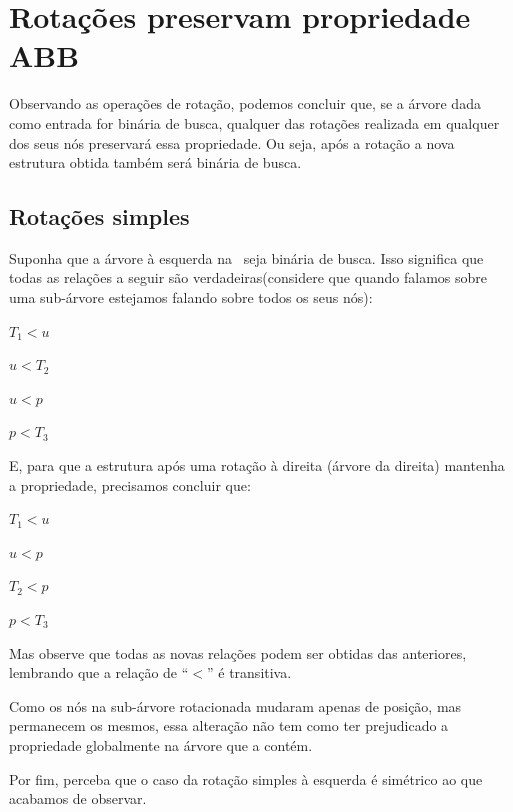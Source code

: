 \documentclass[11pt,twoside]{article}
\theoremstyle{definition}
\begin{document}
\section{Rotações preservam propriedade ABB}

Observando as operações de rotação, podemos concluir que, se a árvore dada como entrada for binária de busca, qualquer das rotações realizada em qualquer dos seus nós preservará essa propriedade. Ou seja, após a rotação a nova estrutura obtida também será binária de busca.

\subsection{Rotações simples}

Suponha que a árvore à esquerda na~ seja binária de busca. Isso significa que todas as relações a seguir são verdadeiras(considere que quando falamos sobre uma sub-árvore estejamos falando sobre todos os seus nós):
\begin{itemize}
	\begin{multicols}{2}
		\item \( T_1 < u \)
		\item \( u < T_2 \)
		\item \( u < p \)
		\item \( p < T_3 \)
	\end{multicols}
\end{itemize}

E, para que a estrutura após uma rotação à direita (árvore da direita) mantenha a propriedade, precisamos concluir que:
\begin{itemize}
	\begin{multicols}{2}
		\item \( T_1 < u \)
		\item \( u < p \)
		\item \( T_2 < p \)
		\item \( p < T_3 \)
	\end{multicols}
\end{itemize}

Mas observe que todas as novas relações podem ser obtidas das anteriores, lembrando que a relação de ``\( < \)'' é transitiva.

Como os nós na sub-árvore rotacionada mudaram apenas de posição, mas permanecem os mesmos, essa alteração não tem como ter prejudicado a propriedade globalmente na árvore que a contém.

Por fim, perceba que o caso da rotação simples à esquerda é simétrico ao que acabamos de observar.
\end{document}
